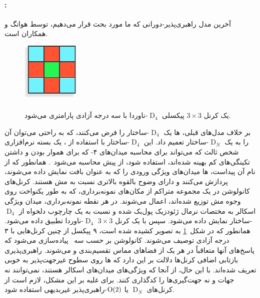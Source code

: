 \paragraph{:}
آخرین مدل راهبری‌پذیر-دورانی که ما مورد بحث قرار می‌دهیم، \emph{} توسط هوانگ و همکاران\cite{huang2019texturenet} است.
\begin{figure}
    \centering
    \includegraphics[width=.16\textwidth]{figures/3x3_D4_invariant_kernel.pdf}
    \captionsetup{width=.21\textwidth}
    \caption{\small
        \\
        یک کرنل $3\times3$ پیکسلی $\operatorname{D}_4$-ناوردا با سه درجه آزادی پارامتری می‌شود.
    }
    \label{fig:3x3_D4_invariant_kernel}
\end{figure}%
بر خلاف مدل‌های قبلی، ها یک $\operatorname{D}_4$-ساختار را فرض می‌کنند، که به راحتی می‌توان آن را به یک $\operatorname{D}_N$-ساختار تعمیم داد.
این $\operatorname{D}_4$-ساختار با استفاده از ، یک بسته نرم‌افزاری شخص ثالث که می‌تواند برای محاسبه میدان‌های ۴- که برای هموار بودن و داشتن تکینگی‌های کم بهینه شده‌اند، استفاده شود، از پیش محاسبه می‌شود~\cite{Huang2018QuadriFlow}.
همانطور که از نام آن پیداست، ها میدان‌های ویژگی ورودی را که به عنوان بافت نمایش داده می‌شوند، پردازش می‌کنند و دارای وضوح بالقوه بالاتری نسبت به مش هستند.
کرنل‌های کانولوشن در یک مجموعه متراکم از مکان‌های نمونه‌برداری، که به طور یکنواخت روی وجوه مش توزیع شده‌اند، اعمال می‌شوند.
در هر نقطه نمونه‌برداری، میدان ویژگی اسکالر به مختصات نرمال ژئودزیک پول‌بک شده و نسبت به یک چارچوب دلخواه از $\operatorname{D}_4$-ساختار نمایش داده می‌شود.
سپس با یک کرنل $3\times3$ $\operatorname{D}_4$-ناوردا تطبیق داده می‌شود.
همانطور که در شکل~\ref{fig:3x3_D4_invariant_kernel} به تصویر کشیده شده است، ۹ پیکسل از چنین کرنل‌هایی با ۳ درجه آزادی توصیف می‌شوند.
کانولوشن بر حسب سه \onexonefarsi\ پیاده‌سازی می‌شود که پاسخ‌های آنها متعاقباً در هر یک از فضاهای مماس تقسیم‌بندی و  می‌شوند.
راهبری‌پذیری بازتابی اضافی کرنل‌ها دلالت بر این دارد که ها روی سطوح غیرجهت‌پذیر به خوبی تعریف شده‌اند.
با این حال، از آنجا که ویژگی‌های  میدان‌های اسکالر هستند، نمی‌توانند نه جهات و نه جهت‌گیری‌ها را کدگذاری کنند.
برای غلبه بر این مشکل، لازم است از کرنل‌های $\operatorname{D}_N$ یا $\operatorname{O}(2)$-راهبری‌پذیر غیربدیهی استفاده شود.